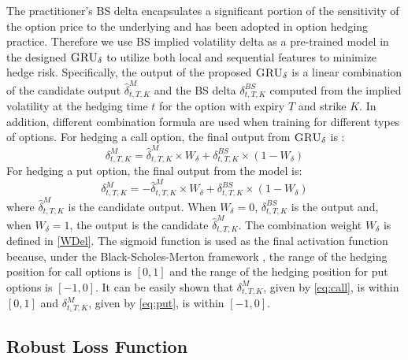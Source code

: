 \documentclass[letterpaper,12pt,titlepage,oneside,final]{book}
\numberwithin{equation}{section}
\theoremstyle{definition}
\newcommand{\model}{\textsc{GRU}_\delta}
\begin{document}
The practitioner's BS delta encapsulates a significant portion of the sensitivity of the option price to the underlying and has been adopted in option hedging practice. Therefore we use BS implied volatility delta as a pre-trained model in the designed $\model$ to utilize both local and sequential features to minimize hedge risk.
Specifically, the output of the proposed  $\model$ is a linear combination of the candidate output $\widehat{\delta}^M_{t,T,K}$ and the BS delta $\delta^{BS}_{t,T,K}$ computed from the implied volatility at the hedging time $t$ for the option with expiry $T$ and strike $K$. In addition,  different combination formula are used when training for different types of options.
For hedging a call option, the final output from $\model$ is :
\begin{equation}
\delta^M_{t,T,K}=\widehat{\delta}^M_{t,T,K} \times W_{\delta} +\delta^{BS}_{t,T,K} \times (1-W_{\delta})
\label{eq:call}
\end{equation}
For hedging a put option, the final output from the model is:
\begin{equation}
\delta^M_{t,T,K}=-\widehat{\delta}^M_{t,T,K} \times W_{\delta} +\delta^{BS}_{t,T,K} \times (1-W_{\delta})
\label{eq:put}
\end{equation}
where $\widehat{\delta}^M_{t,T,K}$ is the candidate output.
When $W_{\delta}=0$,  $\delta^{BS}_{t,T,K}$  is the output and, when $W_{\delta}=1$,  the output  is the candidate $\widehat{\delta}^M_{t,T,K}$. The combination weight $W_{\delta}$
is defined in \eqref{WDel}.
  The sigmoid function is used as the final activation function because, under the Black-Scholes-Merton framework \citep{black1973pricing}, the range of the hedging position for call options is $[0,1]$ and  the range of the hedging position for put options is $[-1,0]$. It can be easily shown that $\delta^M_{t,T,K}$, given by \eqref{eq:call}, is within $[0,1]$ and  $\delta^M_{t,T,K}$, given by \eqref{eq:put}, is within $[-1,0]$.

\subsection{Robust Loss Function}
\end{document}
